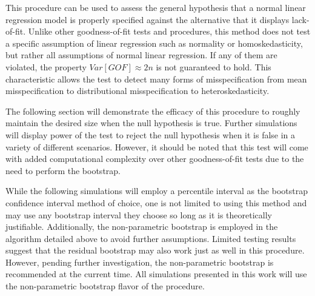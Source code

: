 \documentclass[12pt]{article} %
\theoremstyle{definition}
\begin{document}
		This procedure can be used to assess the general hypothesis that a normal linear regression model is properly specified against the alternative that it displays lack-of-fit.
		Unlike other goodness-of-fit tests and procedures, this method does not test a specific assumption of linear regression such as normality or homoskedasticity, but rather
		all assumptions of normal linear regression. If any of them are violated, the property $Var[GOF] \approx 2n$ is not guaranteed to hold. This characteristic allows the test to detect
		many forms of misspecification from mean misspecification to distributional misspecification to heteroskedasticity.
		
		The following section will demonstrate the efficacy of this procedure to roughly maintain the desired size when the null hypothesis is true. Further simulations will display power
		of the test to reject the null hypothesis when it is false in a variety of different scenarios. However, it should be noted that this test will come with added computational
		complexity over other goodness-of-fit tests due to the need to perform the bootstrap.
		
		While the following simulations will employ a percentile interval as the bootstrap confidence interval method of choice, one is not limited to using this method
		and may use any bootstrap interval they choose so long as it is theoretically justifiable. Additionally, the non-parametric bootstrap is employed in the algorithm detailed above to avoid further
		assumptions. Limited testing results suggest that the residual bootstrap may also work just as well in this procedure. However, pending further investigation, the non-parametric
		bootstrap is recommended at the current time. All simulations presented in this work will use the non-parametric bootstrap flavor of the procedure.

\end{document}
